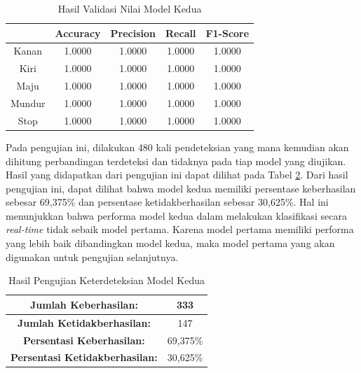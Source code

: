   \begin{table}[H]
    \centering
    \caption{Hasil Validasi Nilai Model Kedua}
    \label{tb:Hasil Validasi Nilai Model Kedua}
    \begin{tabular}{|c|c|c|c|c|}
      \hline
      \rowcolor[HTML]{9B9B9B} 
      \cellcolor[HTML]{9B9B9B} & Accuracy & Precision & Recall & F1-Score \\ \hline
      Kanan                    & 1.0000   & 1.0000    & 1.0000 & 1.0000   \\ \hline
      Kiri                     & 1.0000   & 1.0000    & 1.0000 & 1.0000   \\ \hline
      Maju                     & 1.0000   & 1.0000    & 1.0000 & 1.0000   \\ \hline
      Mundur                   & 1.0000   & 1.0000    & 1.0000 & 1.0000   \\ \hline
      Stop                     & 1.0000   & 1.0000    & 1.0000 & 1.0000   \\ \hline
      \end{tabular}
      \end{table}

Pada pengujian ini, dilakukan 480 kali pendeteksian yang mana kemudian akan dihitung perbandingan terdeteksi dan tidaknya pada tiap model yang diujikan. Hasil yang didapatkan dari pengujian ini dapat dilihat pada Tabel \ref{tb:Hasil Pengujian Keterdeteksian Model Kedua}. Dari hasil pengujian ini, dapat dilihat bahwa model kedua memiliki persentase keberhasilan sebesar 69,375\% dan persentase ketidakberhasilan sebesar 30,625\%. Hal ini menunjukkan bahwa performa model kedua dalam melakukan klasifikasi secara \emph{real-time} tidak sebaik model pertama. Karena model pertama memiliki performa yang lebih baik dibandingkan model kedua, maka model pertama yang akan digunakan untuk pengujian selanjutnya.

      \begin{longtable}{|c|c|}
        \caption{Hasil Pengujian Keterdeteksian Model Kedua}
        \label{tb:Hasil Pengujian Keterdeteksian Model Kedua}   \\
        \hline
        \cellcolor[HTML]{C0C0C0}
        \textbf{Jumlah Keberhasilan:} & 333\\
        \hline
        \cellcolor[HTML]{C0C0C0}
        \textbf{Jumlah Ketidakberhasilan:} & 147\\
        \hline
        \cellcolor[HTML]{C0C0C0}
        \textbf{Persentasi Keberhasilan:} & 69,375\% \\
        \hline
        \cellcolor[HTML]{C0C0C0}
        \textbf{Persentasi Ketidakberhasilan:} & 30,625\% \\
        \hline
        \end{longtable}


